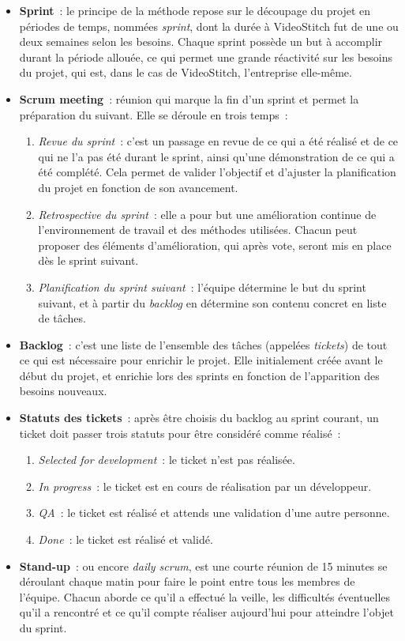 \begin{itemize}
  \item \textbf{Sprint}~: le principe de la méthode repose sur le découpage du projet en 
	périodes de temps, nommées \emph{sprint}, dont la durée à VideoStitch fut de 
	une ou deux semaines selon les besoins. Chaque sprint possède un but à accomplir 
	durant la période allouée, ce qui permet une grande réactivité sur les besoins 
	du projet, qui est, dans le cas de VideoStitch, l'entreprise elle-même.
	\item \textbf{Scrum meeting}~: réunion qui marque la fin d'un sprint et permet la préparation 
	du suivant. Elle se déroule en trois temps~:
	\begin{enumerate}
		\item \textit{Revue du sprint}~: c'est un passage en revue de ce qui a été réalisé
		et de ce qui ne l'a pas été durant le sprint, ainsi qu'une démonstration 
		de ce qui a été complété. Cela permet de valider l'objectif et d'ajuster 
		la planification du projet en fonction de son avancement.
		\item \textit{Retrospective du sprint}~: elle a pour but une amélioration continue 
		de l'environnement de travail et des méthodes utilisées. Chacun peut proposer
		des éléments d'amélioration, qui après vote, seront mis en place dès le sprint
		suivant.
		\item \textit{Planification du sprint suivant}~: l'équipe détermine le but du sprint
		suivant, et à partir du \textit{backlog} en détermine son contenu concret en liste de tâches.
	\end{enumerate}
  \item \textbf{Backlog}~: c'est une liste de l'ensemble des tâches (appelées \emph{tickets})
  de tout ce qui est nécessaire pour enrichir le projet. Elle initialement créée avant
  le début du projet, et enrichie lors des sprints en fonction de l'apparition des besoins nouveaux.
  \item \textbf{Statuts des tickets}~: après être choisis du backlog au sprint courant, 
  un ticket doit passer trois statuts pour être considéré comme réalisé~:
    \begin{enumerate}
      \item \textit{Selected for development}~: le ticket n'est pas réalisée.
      \item \textit{In progress}~: le ticket est en cours de réalisation par un développeur.
      \item \textit{QA}~: le ticket est réalisé et attends une validation d'une autre personne.
      \item \textit{Done}~: le ticket est réalisé et validé. 
    \end{enumerate}
  \item \textbf{Stand-up}~: \label{stand-up} ou encore \textit{daily scrum}, est une courte réunion de 15 minutes
  se déroulant chaque matin pour faire le point entre tous les membres de l'équipe.
  Chacun aborde ce qu'il a effectué la veille, les difficultés éventuelles qu'il
  a rencontré et ce qu'il compte réaliser aujourd'hui pour atteindre l'objet du sprint.
\end{itemize}
